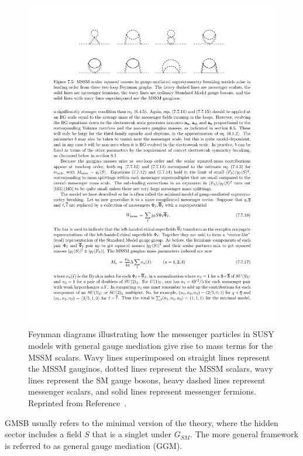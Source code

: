 \begin{figure}[htbp]
    \centering
        \includegraphics[width=\textwidth]{Figures/Theory/GMSBscalar.pdf}
    \caption[Feynman diagrams illustrating how the messenger particles in SUSY models
    with general gauge mediation give rise to mass terms for 
    the MSSM scalars.]{Feynman diagrams illustrating how the messenger particles in SUSY models
    with general gauge mediation give rise to mass terms for 
    the MSSM scalars. Wavy lines superimposed on straight lines represent the MSSM gauginos, 
    dotted lines represent the MSSM scalars, wavy lines represent the SM gauge bosons, heavy dashed lines
    represent messenger scalars, and solid lines represent messenger fermions.
    Reprinted from Reference~\cite{SUSYprimer}.}
    \label{fig:GMSBscalars}
\end{figure}

GMSB usually refers to the minimal version of the theory, where the hidden sector includes a field $S$ that is a singlet under $G_{SM}$. 
The more general framework is referred to as general gauge mediation (GGM). 

